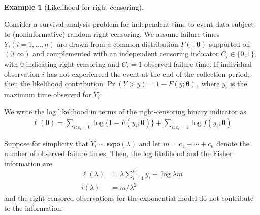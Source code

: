 \documentclass[
  11pt,
  letterpaper,
]{scrbook}
\theoremstyle{definition}
\newtheorem{example}{Example}[chapter]
\theoremstyle{plain}
\theoremstyle{plain}
\theoremstyle{plain}
\theoremstyle{definition}
\theoremstyle{definition}
\theoremstyle{plain}
\theoremstyle{plain}
\theoremstyle{remark}
\begin{document}
\begin{example}[Likelihood for
right-censoring]\protect\hypertarget{exm-likelihood-survival}{}\label{exm-likelihood-survival}

Consider a survival analysis problem for independent time-to-event data
subject to (noninformative) random right-censoring. We assume failure
times \(Y_i (i=1, \ldots, n)\) are drawn from a common distribution
\(F(\cdot; \boldsymbol{\theta})\) supported on \((0, \infty)\) and
complemented with an independent censoring indicator
\(C_i \in \{0,1\},\) with \(0\) indicating right-censoring and \(C_i=1\)
observed failure time. If individual observation \(i\) has not
experienced the event at the end of the collection period, then the
likelihood contribution \(\Pr(Y > y) = 1-F(y; \boldsymbol{\theta}),\)
where \(y_i\) is the maximum time observed for \(Y_i.\)

We write the log likelihood in terms of the right-censoring binary
indicator as \begin{align*}
\ell(\boldsymbol{\theta}) = \sum_{i: c_i=0} \log \{1- F(y_i; \boldsymbol{\theta})\} + \sum_{i: c_i=1} \log f(y_i; \boldsymbol{\theta})
\end{align*}

Suppose for simplicity that \(Y_i \sim \mathsf{expo}(\lambda)\) and let
\(m=c_1 + \cdots + c_n\) denote the number of observed failure times.
Then, the log likelihood and the Fisher information are \begin{align*}
\ell(\lambda) &= \lambda \sum_{i=1}^n y_i + \log \lambda m\\
i(\lambda) &= m/\lambda^2
\end{align*} and the right-censored observations for the exponential
model do not contribute to the information.

\end{example}
\end{document}
